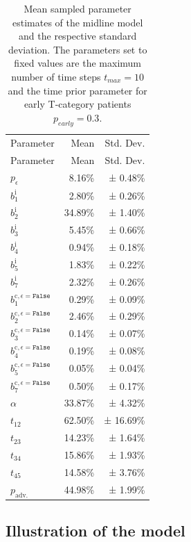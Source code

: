 \documentclass[
  sn-mathphys-num,
]{sn-jnl}
\begin{document}
\begin{longtable}[]{@{}lrr@{}}

\caption{\label{tbl-midline-params}Mean sampled parameter estimates of
the midline model and the respective standard deviation. The parameters
set to fixed values are the maximum number of time steps \(t_{max}=10\)
and the time prior parameter for early T-category patients
\(p_{early}=0.3\).}

\tabularnewline

\tabularnewline
\toprule\noalign{}
Parameter & Mean & Std. Dev. \\
\midrule\noalign{}
\endfirsthead
\toprule\noalign{}
Parameter & Mean & Std. Dev. \\
\midrule\noalign{}
\endhead
\bottomrule\noalign{}
\endlastfoot
$p_\epsilon$ & 8.16\% & ± 0.48\% \\
$b_1^\text{i}$ & 2.80\% & ± 0.26\% \\
$b_2^\text{i}$ & 34.89\% & ± 1.40\% \\
$b_3^\text{i}$ & 5.45\% & ± 0.66\% \\
$b_4^\text{i}$ & 0.94\% & ± 0.18\% \\
$b_5^\text{i}$ & 1.83\% & ± 0.22\% \\
$b_7^\text{i}$ & 2.32\% & ± 0.26\% \\
$b_1^{\text{c},\epsilon=\texttt{False}}$ & 0.29\% & ± 0.09\% \\
$b_2^{\text{c},\epsilon=\texttt{False}}$ & 2.46\% & ± 0.29\% \\
$b_3^{\text{c},\epsilon=\texttt{False}}$ & 0.14\% & ± 0.07\% \\
$b_4^{\text{c},\epsilon=\texttt{False}}$ & 0.19\% & ± 0.08\% \\
$b_5^{\text{c},\epsilon=\texttt{False}}$ & 0.05\% & ± 0.04\% \\
$b_7^{\text{c},\epsilon=\texttt{False}}$ & 0.50\% & ± 0.17\% \\
$\alpha$ & 33.87\% & ± 4.32\% \\
$t_{12}$ & 62.50\% & ± 16.69\% \\
$t_{23}$ & 14.23\% & ± 1.64\% \\
$t_{34}$ & 15.86\% & ± 1.93\% \\
$t_{45}$ & 14.58\% & ± 3.76\% \\
$p_\text{adv.}$ & 44.98\% & ± 1.99\% \\

\end{longtable}

\subsection{Illustration of the model}\label{illustration-of-the-model}
\end{document}
